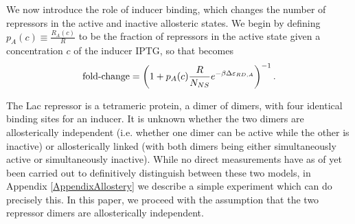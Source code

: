 We now introduce the role of inducer binding, which changes the number of
repressors in the active and inactive allosteric states. We begin by defining
\(p_A(c) \equiv \frac{R_A(c)}{R}\) to be the fraction of repressors in the
active state given a concentration \(c\) of the inducer IPTG, so that %
\eref[eq4] becomes
\begin{equation}
\operatorname{fold-change} = \left( 1+p_A(c) \frac{R}{N_{NS}}e^{-\beta
	\Delta\varepsilon_{RD,A}} \right)^{-1}. \label{eq5}
\end{equation}

The Lac repressor is a tetrameric protein, a dimer of dimers, with four
identical binding sites for an inducer. It is unknown whether the two dimers are
allosterically independent (i.e. whether one dimer can be active while the other
is inactive) or allosterically linked (with both dimers being either
simultaneously active or simultaneously inactive). While no direct measurements
have as of yet been carried out to definitively distinguish between these two
models, in Appendix \ref{AppendixAllostery} we describe a simple experiment
which can do precisely this. In this paper, we proceed with the assumption that
the two repressor dimers are allosterically independent.

